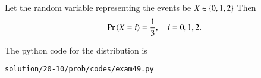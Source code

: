 Let the random variable representing the events be $X \in \left\{0,1,2\right\}$
Then
\begin{align}
\Pr\left(X=i\right) = \frac{1}{3}, \quad i = 0,1,2.
\end{align}

The python code for the distribution is
\begin{lstlisting}
solution/20-10/prob/codes/exam49.py
\end{lstlisting}

